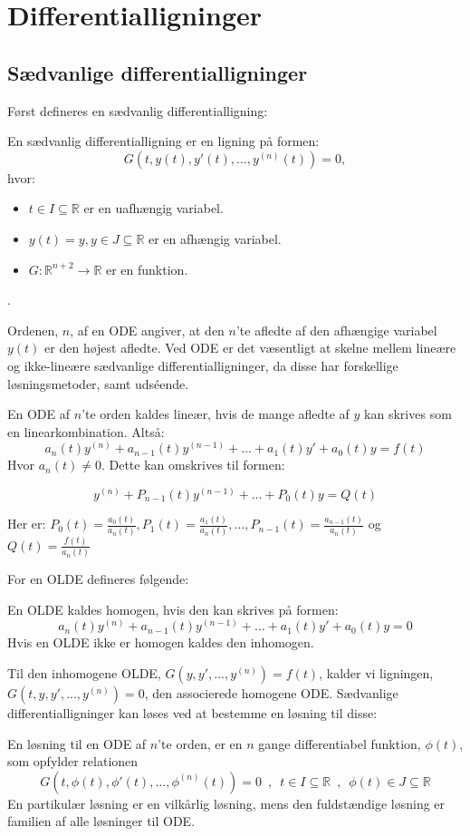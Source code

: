 \chapter{Differentialligninger}

\section{Sædvanlige differentialligninger}
Først defineres en sædvanlig differentialligning:
\begin{definition}
En sædvanlig differentialligning er en ligning på formen: \hfill \break
$$G(t,y(t),y'(t), \hdots , y^{(n)}(t))=0,$$
hvor:
\begin{itemize}
    \item $t \in I \subseteq \mathbb{R}$ er en uafhængig variabel.
    \item $y(t) = y, y\in J \subseteq \mathbb{R}$ er en afhængig variabel.
    \item $G:\mathbb{R}^{n+2} \rightarrow \mathbb{R}$ er en funktion.
\end{itemize}.
\end{definition}
Ordenen, $n$, af en ODE angiver, at den $n$'te afledte af den afhængige variabel $y(t)$ er den højest afledte. Ved ODE er det væsentligt at skelne mellem lineære og ikke-lineære sædvanlige differentialligninger, da disse har forskellige løsningsmetoder, samt udséende.
\begin{definition}\label{OLDE}En ODE af $n$'te orden kaldes lineær, hvis de mange afledte af $y$ kan skrives som en linearkombination. Altså: \\ 
$$a_{n}(t)y^{(n)}  + a_{n-1}(t)y^{(n-1)}+ \hdots + a_{1}(t)y' + a_{0}(t)y = f(t)$$
Hvor $a_n(t)\neq 0$. Dette kan omskrives til formen:

$$y^{(n)}+P_{n-1}(t)y^{(n-1)}+\hdots +P_0(t)y=Q(t)$$ 

Her er: $P_0(t)=\frac{a_0(t)}{a_n(t)} , P_1(t)=\frac{a_1(t)}{a_n(t)}, \hdots, P_{n-1}(t)=\frac{a_{n-1}(t)}{a_n(t)}$ og $Q(t)=\frac{f(t)}{a_n(t)}$
\end{definition}

For en OLDE defineres følgende:
\begin{definition}[Homogenitet]
En OLDE kaldes homogen, hvis den kan skrives på formen: 
$$a_{n}(t)y^{(n)}  + a_{n-1}(t)y^{(n-1)}+ \hdots + a_{1}(t)y' + a_{0}(t)y = 0$$ 
Hvis en OLDE ikke er homogen kaldes den inhomogen.
\end{definition}
Til den inhomogene OLDE, $G(y,y',...,y^{(n)})=f(t)$, kalder vi ligningen, $G(t,y,y',...,y^{(n)})=0$, den associerede homogene ODE. Sædvanlige differentialligninger kan løses ved at bestemme en løsning til disse:
\begin{definition} 
En løsning til en ODE af $n$'te orden, er en $n$ gange differentiabel funktion, $\phi (t)$, som opfylder relationen
$$G(t,\phi (t),\phi '(t), \hdots, \phi^{(n)}(t))=0 \enspace ,\enspace t\in I \subseteq \mathbb{R} \enspace , \enspace \phi (t) \in J \subseteq \mathbb{R}$$
En partikulær løsning er en vilkårlig løsning, mens den fuldstændige løsning er familien af alle løsninger til ODE.
\end{definition}

